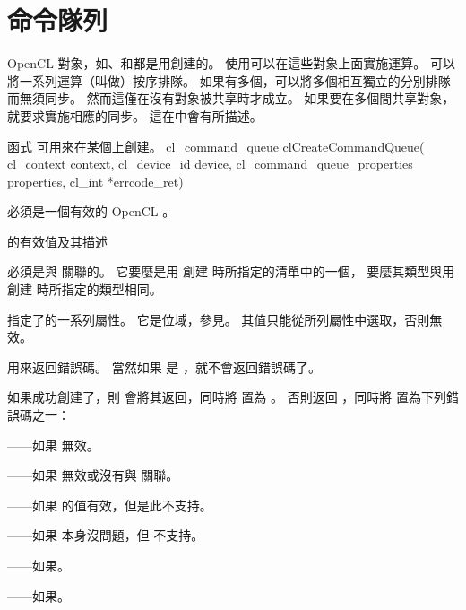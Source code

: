 \section{命令隊列}

OpenCL 對象，如、和都是用創建的。
使用可以在這些對象上面實施運算。
可以將一系列運算（叫做）按序排隊。
如果有多個，可以將多個相互獨立的分別排隊而無須同步。
然而這僅在沒有對象被共享時才成立。
如果要在多個間共享對象，就要求實施相應的同步。
這在中會有所描述。

函式  可用來在某個上創建。
\startclc
cl_command_queue clCreateCommandQueue(
			cl_context context,
			cl_device_id device,
			cl_command_queue_properties properties,
			cl_int *errcode_ret)
\stopclc

 必須是一個有效的 OpenCL 。

\startbuffer[tblcmdqprop]
的有效值及其描述
\stopbuffer
{}
{}

 必須是與  關聯的。
它要麼是用  創建  時所指定的清單中的一個，
要麼其類型與用  創建  時所指定的類型相同。

 指定了的一系列屬性。
它是位域，參見。
其值只能從所列屬性中選取，否則無效。

 用來返回錯誤碼。
當然如果  是 ，就不會返回錯誤碼了。

如果成功創建了，則  會將其返回，同時將  置為 。
否則返回 ，同時將  置為下列錯誤碼之一：
\startigBase
\item {}——如果  無效。
\item {}——如果  無效或沒有與  關聯。
\item {}——如果  的值有效，但是此不支持。
\item {}——如果  本身沒問題，但  不支持。
\item {}——如果\scdevfailres。
\item {}——如果\schostfailres。
\stopigBase

